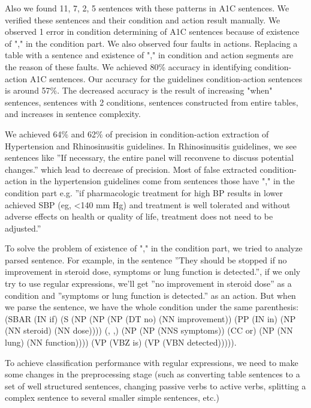 \documentclass[12pt,letterpaper]{article}
\begin{document}
Also we found 11, 7, 2, 5 sentences with these patterns in A1C sentences. We verified these sentences and their condition and action result manually. We observed 1 error in condition determining of A1C sentences because of existence of "," in the condition part. We also observed four faults in actions. Replacing a table with a sentence and existence of "," in condition and action segments are the reason of these faults. We achieved 80\% accuracy in identifying condition-action A1C sentences. Our accuracy for the guidelines condition-action sentences is around 57\%. The decreased accuracy is the result of increasing "when" sentences, sentences with 2 conditions, sentences constructed from entire tables, and increases in sentence complexity.

We achieved 64\% and 62\% of precision in condition-action extraction of Hypertension \cite{doi:10.1001/jama.2013.284427} and Rhinosinusitis\cite{chow2012idsa} guidelines. In Rhinosinusitis guidelines, we see sentences like ''If necessary, the entire panel will reconvene to discuss potential changes.'' which lead to decrease of precision. Most of false extracted condition-action in the hypertension guidelines come from sentences those have "," in the condition part e.g. ''if pharmacologic treatment for high BP results in lower achieved SBP (eg, \textless 140 mm Hg) and treatment is well tolerated and without adverse effects on health or quality of life, treatment does not need to be adjusted.''

To solve the problem of existence of "," in the condition part, we tried to analyze parsed sentence. For example, in the sentence ''They should be stopped if no improvement in steroid dose, symptoms or lung function is detected.'', if we only try to use regular expressions, we'll get ''no improvement in steroid dose'' as a condition and ''symptoms or lung function is detected.'' as an action. But when we parse the sentence, we have the whole condition under the same parenthesis:(SBAR (IN if) (S (NP (NP (NP (DT no) (NN improvement)) (PP (IN in) (NP (NN steroid) (NN dose)))) (, ,) (NP (NP (NNS symptoms)) (CC or) (NP (NN lung) (NN function)))) (VP (VBZ is) (VP (VBN detected))))).

To achieve classification performance with regular expressions, we need to make some changes in the preprocessing stage (such as converting table sentences to a set of well structured sentences, changing passive verbs to active verbs, splitting a complex sentence to several smaller simple sentences, etc.)
\end{document}
